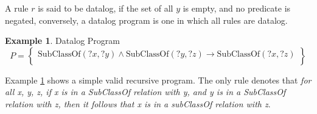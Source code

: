 \documentclass[manuscript,screen,review]{acmart}
\theoremstyle{definition}
\newtheorem{exmp}{Example}[section]
\begin{document}
A rule $r$ is said to be datalog, if the set of all $y$ is empty, and no predicate is negated, conversely, a
datalog program is one in which all rules are datalog.
\begin{exmp}{Datalog Program}\label{ex1}
	\[
		P = \left\{  \begin{array}{l}
			\text{SubClassOf}(?x, ?y) \wedge \text{SubClassOf}(?y, ?z) \rightarrow \text{SubClassOf}(?x, ?z) \\
		\end{array}\right\}
	\]
\end{exmp}
Example \ref{ex1} shows a simple valid recursive program. The only rule denotes that \textit{for all x, y, z, if x is
	in a SubClassOf relation with y, and y is in a SubClassOf relation with z, then it follows that x is in a subClassOf
	relation with z}.
\end{document}

